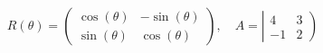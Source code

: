\documentclass[presentatie.tex]{subfiles}
\begin{document}
\begin{frame}

	\begin{align*}
		R(\theta) = \begin{pmatrix}
			\cos(\theta) & -\sin(\theta)\\
			\sin(\theta) & \cos(\theta)
		\end{pmatrix},\quad
		A = \left|\begin{matrix}
			4 & 3\\
			-1 & 2
		\end{matrix}\right)
	\end{align*}
\end{frame}





	
\end{document}
